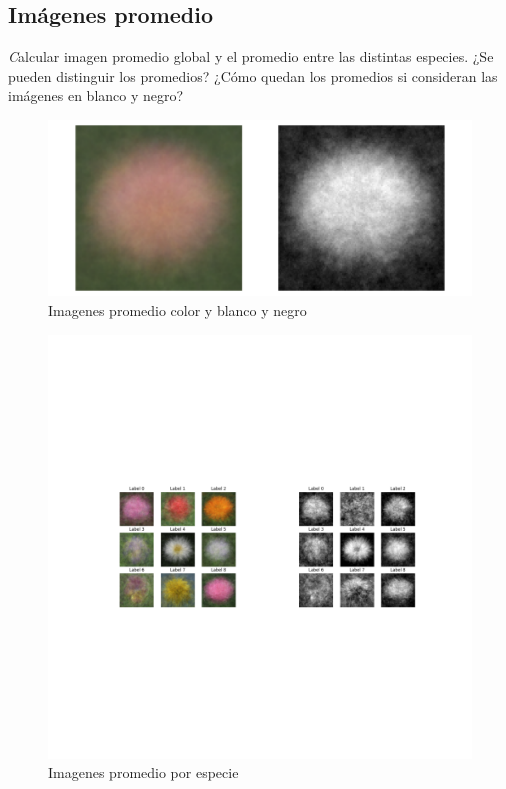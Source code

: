 \documentclass{article}
\begin{document}
\subsection{Imágenes promedio}

{\emph Calcular imagen promedio global y el promedio entre las distintas especies. ¿Se pueden
distinguir los promedios? ¿Cómo quedan los promedios si consideran las imágenes en
blanco y negro?}

\begin{figure}[h!]
  \centering    
  \includegraphics[width=.4\textwidth]{7_1_promedio.png}
  \caption{Imagenes promedio color y blanco y negro}
\end{figure}


\begin{figure}[h]
  \centering    
  \includegraphics[width=1\textwidth]{7_4_promedio_especies_ambos.png}
  \caption{Imagenes promedio por especie}
\end{figure}


\end{document}
